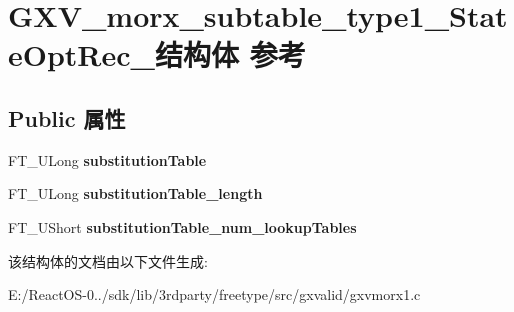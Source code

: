 \hypertarget{struct_g_x_v__morx__subtable__type1___state_opt_rec__}{}\section{G\+X\+V\+\_\+morx\+\_\+subtable\+\_\+type1\+\_\+\+State\+Opt\+Rec\+\_\+结构体 参考}
\label{struct_g_x_v__morx__subtable__type1___state_opt_rec__}
\subsection*{Public 属性}
\begin{DoxyCompactItemize}
\item 
\mbox{\label{struct_g_x_v__morx__subtable__type1___state_opt_rec___a0f5186b4022ef2f9f316f2256afc0648}} 
F\+T\+\_\+\+U\+Long {\bfseries substitution\+Table}
\item 
\mbox{\label{struct_g_x_v__morx__subtable__type1___state_opt_rec___ae99b4356adf4b91ccc163dfd5db9a89a}} 
F\+T\+\_\+\+U\+Long {\bfseries substitution\+Table\+\_\+length}
\item 
\mbox{\label{struct_g_x_v__morx__subtable__type1___state_opt_rec___a7e306d053dd6de8879a8f98896016bfe}} 
F\+T\+\_\+\+U\+Short {\bfseries substitution\+Table\+\_\+num\+\_\+lookup\+Tables}
\end{DoxyCompactItemize}


该结构体的文档由以下文件生成\+:\begin{DoxyCompactItemize}
\item 
E\+:/\+React\+O\+S-\/0../sdk/lib/3rdparty/freetype/src/gxvalid/gxvmorx1.\+c\end{DoxyCompactItemize}
